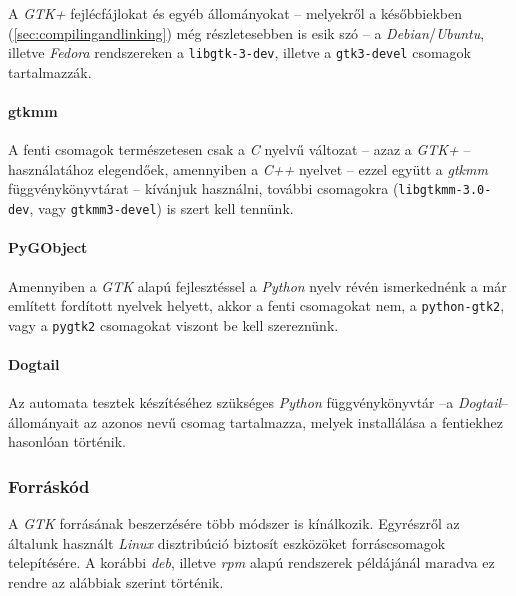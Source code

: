 A \textit{GTK+} fejlécfájlokat és egyéb állományokat -- melyekről a későbbiekben (\ref{sec:compilingandlinking}) még részletesebben is esik szó -- a \textit{Debian}/\textit{Ubuntu}, illetve \textit{Fedora} rendszereken a \texttt{libgtk-3-dev}, illetve a \texttt{gtk3-devel} csomagok tartalmazzák.

\paragraph{gtkmm}

A fenti csomagok természetesen csak a \textit{C} nyelvű változat -- azaz a \textit{GTK+} -- használatához elegendőek, amennyiben a \textit{C++} nyelvet -- ezzel együtt a \textit{gtkmm} függvénykönyvtárat -- kívánjuk használni, további csomagokra (\texttt{libgtkmm-3.0-dev}, vagy \texttt{gtkmm3-devel}) is szert kell tennünk.

\paragraph{PyGObject}

Amennyiben a \textit{GTK} alapú fejlesztéssel a \textit{Python} nyelv révén ismerkednénk a már említett fordított nyelvek helyett, akkor a fenti csomagokat nem, a \texttt{python-gtk2}, vagy a \texttt{pygtk2} csomagokat viszont be kell szereznünk.

\paragraph{Dogtail}

Az automata tesztek készítéséhez szükséges \textit{Python} függvénykönyvtár --a \textit{Dogtail}-- állományait az azonos nevű csomag tartalmazza, melyek installálása a fentiekhez hasonlóan történik.

\subsubsection{Forráskód}

A \textit{GTK} forrásának beszerzésére több módszer is kínálkozik. Egyrészről az általunk használt \textit{Linux} disztribúció biztosít eszközöket forráscsomagok telepítésére. A korábbi \textit{deb}, illetve \textit{rpm} alapú rendszerek példájánál maradva ez rendre az alábbiak szerint történik.


